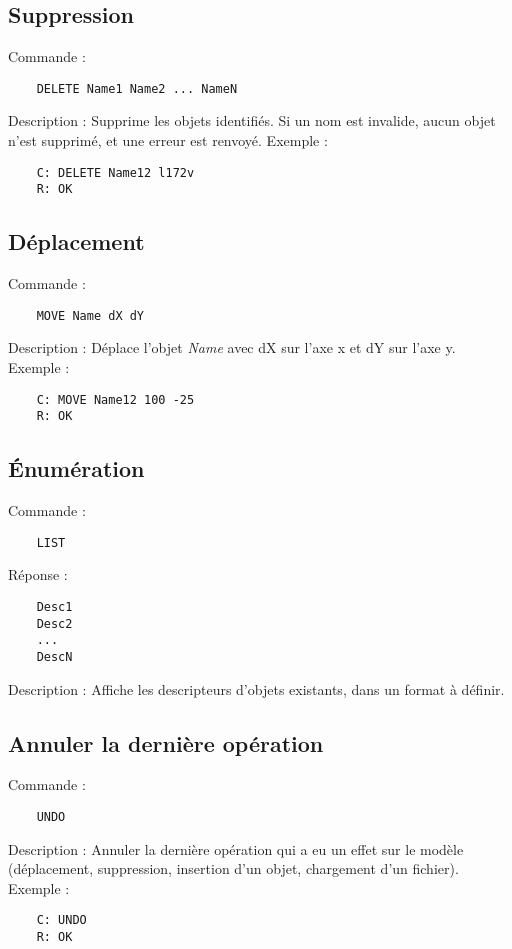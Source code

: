 \documentclass[oneside]{book}
\begin{document}
\subsection*{Suppression}
Commande :
\begin{lstlisting}
	DELETE Name1 Name2 ... NameN
\end{lstlisting}
Description : Supprime les objets identifiés. Si un nom est invalide, aucun objet n'est supprimé, et une erreur est renvoyé. \newline
Exemple : 
\begin{lstlisting}
	C: DELETE Name12 l172v
	R: OK
\end{lstlisting}

\subsection*{Déplacement}
Commande : 
\begin{lstlisting}
	MOVE Name dX dY
\end{lstlisting}
Description : Déplace l'objet \textit{Name} avec dX sur l'axe x et dY sur l'axe y.\newline
Exemple : 
\begin{lstlisting}
	C: MOVE Name12 100 -25
	R: OK
\end{lstlisting}

\subsection*{Énumération}
Commande : 
\begin{lstlisting}
	LIST
\end{lstlisting}
Réponse : 
\begin{lstlisting}
	Desc1
	Desc2
	...
	DescN
\end{lstlisting}
Description : Affiche les descripteurs d'objets existants, dans un format à définir.\newline

\subsection*{Annuler la dernière opération}
Commande : 
\begin{lstlisting}
	UNDO
\end{lstlisting}
Description : Annuler la dernière opération qui a eu un effet sur le modèle (déplacement, suppression, insertion d'un objet, chargement d'un fichier).\newline
Exemple : 
\begin{lstlisting}
	C: UNDO
	R: OK
\end{lstlisting}
\end{document}
